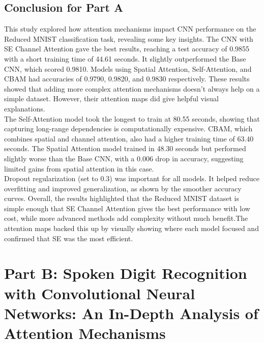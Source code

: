 \documentclass[12pt]{article}
\begin{document}
\subsection{Conclusion for Part A}
This study explored how attention mechanisms impact CNN performance on the Reduced MNIST classification task, revealing some key insights. The CNN with SE Channel Attention gave the best results, reaching a test accuracy of 0.9855 with a short training time of 44.61 seconds. It slightly outperformed the Base CNN, which scored 0.9810. Models using Spatial Attention, Self-Attention, and CBAM had accuracies of 0.9790, 0.9820, and 0.9830 respectively. These results showed that adding more complex attention mechanisms doesn’t always help on a simple dataset. However, their attention maps did give helpful visual explanations.\\
The Self-Attention model took the longest to train at 80.55 seconds, showing that capturing long-range dependencies is computationally expensive. CBAM, which combines spatial and channel attention, also had a higher training time of 63.40 seconds. The Spatial Attention model trained in 48.30 seconds but performed slightly worse than the Base CNN, with a 0.006 drop in accuracy, suggesting limited gains from spatial attention in this case.\\
Dropout regularization (set to 0.3) was important for all models. It helped reduce overfitting and improved generalization, as shown by the smoother accuracy curves. Overall, the results highlighted that the Reduced MNIST dataset is simple enough that SE Channel Attention gives the best performance with low cost, while more advanced methods add complexity without much benefit.The attention maps backed this up by visually showing where each model focused and confirmed that SE was the most efficient.

\section{Part B: Spoken Digit Recognition with Convolutional Neural Networks: An In-Depth Analysis of Attention Mechanisms}
\end{document}
